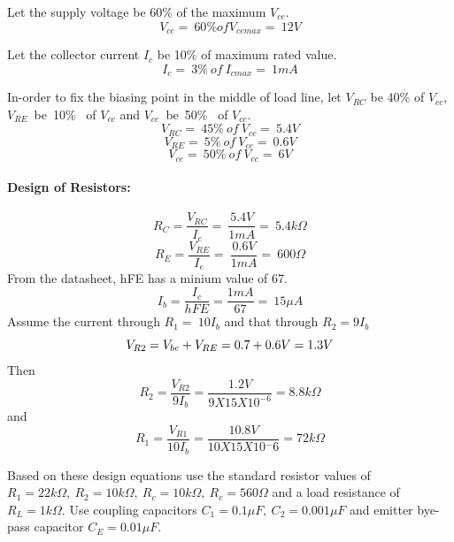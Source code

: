 \documentclass{book}
\begin{document}
  Let the supply voltage be 60\% of the maximum $V_{ce}$.  \begin{equation}
V_{cc}=\ 60\% of V_{cemax}=\ 12 V
\end{equation}

\noindent Let the collector current $I_c$ be 10\% of maximum rated value.
\begin{equation}
I_{c}=\ 3\% \ of \ I_{cmax}=\ 1 mA
\end{equation}

\noindent In-order to fix the biasing point in the middle of load line, let $V_{RC}$ be 40\% of $V_{cc}$, $V_{RE}$\ be\ 10\% \ of $V_{cc}$ and $V_{ce}$\  be\ 50\% \ of $V_{cc}$.
\begin{equation}
V_{RC}=\ 45\% \ of \ V_{cc}=\ 5.4V
\end{equation}
\begin{equation}
V_{RE}=\ 5\% \ of \ V_{cc}=\ 0.6V
\end{equation}
\begin{equation}
V_{ce}=\ 50\% \ of \ V_{cc}=\ 6V
\end{equation}
\paragraph{Design of Resistors:}
\begin{equation}
R_C=\frac{V_{RC}}{I_c}=\ \frac{5.4V}{1mA}=\ 5.4 k\Omega
\end{equation}
\begin{equation}
R_E=\frac{V_{RE}}{I_e}=\ \frac{0.6V}{1mA}=\ 600\Omega
\end{equation}
\noindent From the datasheet, hFE has a minium value of 67. 
\begin{equation}
I_b=\frac{I_c}{hFE}=\frac{1mA}{67}=\ 15 \mu A
\end{equation}
\noindent Assume the current through $R_1=\ 10 I_b$ and that through $R_2=9I_b$ 
\begin{equation}
 V_{R2}=V_{be}+V_{RE}\\ =0.7+0.6V=1.3V
\end{equation}
\noindent Then
\begin{equation}
R_2=\frac{V_{R2}}{9I_b}=\frac{1.2V}{9X15X10^{-6}}=8.8 k\Omega
\end{equation}
\noindent and 
\begin{equation}
R_1=\frac{V_{R1}}{10I_b}=\frac{10.8V}{10X15X10{^-6}}= 72k\Omega
\end{equation}

\noindent Based on these design equations use the standard resistor values of $R_1=22k\Omega,\ R_2=10k\Omega, \ R_c=10k\Omega,\ R_c=560\Omega$ and a load resistance of $R_L=1k\Omega$.
Use coupling capacitors $C_1=0.1 \mu F,\ C_2=0.001\mu F$ and emitter bye-pass capacitor $C_E=0.01\mu F$.
\end{document}
